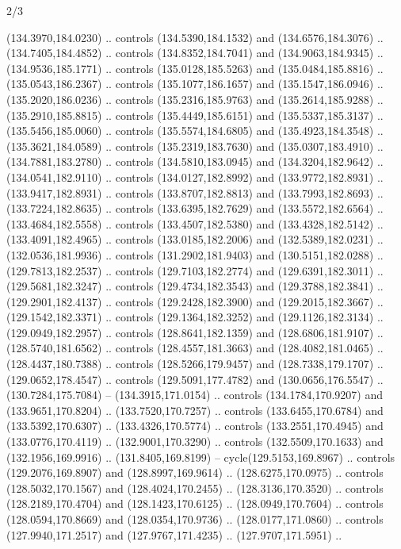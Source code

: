\begin{flagdescription}{2/3}
\begin{scope}[shift={(0.5\flaglength,0.5)},scale=\flagwidth/320]
\begin{scope}[y=0.8pt, x=0.8pt, yscale=-1,shift={(-118.3,-146)}]
  (134.3970,184.0230) .. controls (134.5390,184.1532) and (134.6576,184.3076) ..
  (134.7405,184.4852) .. controls (134.8352,184.7041) and (134.9063,184.9345) ..
  (134.9536,185.1771) .. controls (135.0128,185.5263) and (135.0484,185.8816) ..
  (135.0543,186.2367) .. controls (135.1077,186.1657) and (135.1547,186.0946) ..
  (135.2020,186.0236) .. controls (135.2316,185.9763) and (135.2614,185.9288) ..
  (135.2910,185.8815) .. controls (135.4449,185.6151) and (135.5337,185.3137) ..
  (135.5456,185.0060) .. controls (135.5574,184.6805) and (135.4923,184.3548) ..
  (135.3621,184.0589) .. controls (135.2319,183.7630) and (135.0307,183.4910) ..
  (134.7881,183.2780) .. controls (134.5810,183.0945) and (134.3204,182.9642) ..
  (134.0541,182.9110) .. controls (134.0127,182.8992) and (133.9772,182.8931) ..
  (133.9417,182.8931) .. controls (133.8707,182.8813) and (133.7993,182.8693) ..
  (133.7224,182.8635) .. controls (133.6395,182.7629) and (133.5572,182.6564) ..
  (133.4684,182.5558) .. controls (133.4507,182.5380) and (133.4328,182.5142) ..
  (133.4091,182.4965) .. controls (133.0185,182.2006) and (132.5389,182.0231) ..
  (132.0536,181.9936) .. controls (131.2902,181.9403) and (130.5151,182.0288) ..
  (129.7813,182.2537) .. controls (129.7103,182.2774) and (129.6391,182.3011) ..
  (129.5681,182.3247) .. controls (129.4734,182.3543) and (129.3788,182.3841) ..
  (129.2901,182.4137) .. controls (129.2428,182.3900) and (129.2015,182.3667) ..
  (129.1542,182.3371) .. controls (129.1364,182.3252) and (129.1126,182.3134) ..
  (129.0949,182.2957) .. controls (128.8641,182.1359) and (128.6806,181.9107) ..
  (128.5740,181.6562) .. controls (128.4557,181.3663) and (128.4082,181.0465) ..
  (128.4437,180.7388) .. controls (128.5266,179.9457) and (128.7338,179.1707) ..
  (129.0652,178.4547) .. controls (129.5091,177.4782) and (130.0656,176.5547) ..
  (130.7284,175.7084) -- (134.3915,171.0154) .. controls (134.1784,170.9207) and
  (133.9651,170.8204) .. (133.7520,170.7257) .. controls (133.6455,170.6784) and
  (133.5392,170.6307) .. (133.4326,170.5774) .. controls (133.2551,170.4945) and
  (133.0776,170.4119) .. (132.9001,170.3290) .. controls (132.5509,170.1633) and
  (132.1956,169.9916) .. (131.8405,169.8199) -- cycle(129.5153,169.8967) ..
  controls (129.2076,169.8907) and (128.8997,169.9614) .. (128.6275,170.0975) ..
  controls (128.5032,170.1567) and (128.4024,170.2455) .. (128.3136,170.3520) ..
  controls (128.2189,170.4704) and (128.1423,170.6125) .. (128.0949,170.7604) ..
  controls (128.0594,170.8669) and (128.0354,170.9736) .. (128.0177,171.0860) ..
  controls (127.9940,171.2517) and (127.9767,171.4235) .. (127.9707,171.5951) ..

\end{scope}
\end{scope}
\end{flagdescription}
